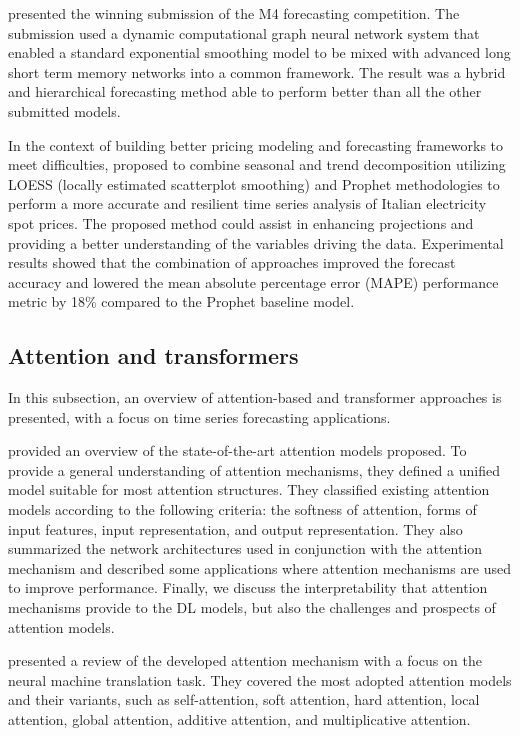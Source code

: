 \cite{SMYL202075} presented the winning submission of the M4 forecasting competition.
The submission used a dynamic computational graph neural network system that enabled a standard exponential smoothing model to be mixed with advanced long short term memory networks into a common framework.
The result was a hybrid and hierarchical forecasting method able to perform better than all the other submitted models.

In the context of building better pricing modeling and forecasting frameworks to meet difficulties, \cite{en16031371} proposed to combine seasonal and trend decomposition utilizing LOESS (locally estimated scatterplot smoothing) and Prophet methodologies to perform a more accurate and resilient time series analysis of Italian electricity spot prices.
The proposed method could assist in enhancing projections and providing a better understanding of the variables driving the data.
Experimental results showed that the combination of approaches improved the forecast accuracy and lowered the mean absolute percentage error (MAPE) performance metric by 18\% compared to the Prophet baseline model.


\vspace{0.1 cm}
\subsection{Attention and transformers}
\label{sec:transformers}
\vspace{0.1 cm}

In this subsection, an overview of attention-based and transformer approaches is presented, with a focus on time series forecasting applications.

\cite{NIU202148} provided an overview of the state-of-the-art attention models proposed.
To provide a general understanding of attention mechanisms, they defined a unified model suitable for most attention structures.
They classified existing attention models according to the following criteria: the softness of attention, forms of input features, input representation, and output representation.
They also summarized the network architectures used in conjunction with the attention mechanism and described some applications where attention mechanisms are used to improve performance.
Finally, we discuss the interpretability that attention mechanisms provide to the DL models, but also the challenges and prospects of attention models. 

\cite{9586824} presented a review of the developed attention mechanism with a focus on the neural machine translation task.
They covered the most adopted attention models and their variants, such as self-attention, soft attention, hard attention, local attention, global attention, additive attention, and multiplicative attention.

